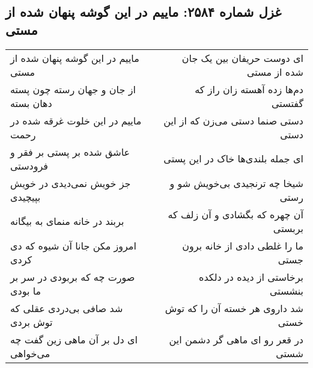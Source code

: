\begin{center}
\section*{غزل شماره ۲۵۸۴: ماییم در این گوشه پنهان شده از مستی}
\label{sec:2584}
\begin{longtable}{l p{0.5cm} r}
ماییم در این گوشه پنهان شده از مستی
&&
ای دوست حریفان بین یک جان شده از مستی
\\
از جان و جهان رسته چون پسته دهان بسته
&&
دم‌ها زده آهسته زان راز که گفتستی
\\
ماییم در این خلوت غرقه شده در رحمت
&&
دستی صنما دستی می‌زن که از این دستی
\\
عاشق شده بر پستی بر فقر و فرودستی
&&
ای جمله بلندی‌ها خاک در این پستی
\\
جز خویش نمی‌دیدی در خویش بپیچیدی
&&
شیخا چه ترنجیدی بی‌خویش شو و رستی
\\
بربند در خانه منمای به بیگانه
&&
آن چهره که بگشادی و آن زلف که بربستی
\\
امروز مکن جانا آن شیوه که دی کردی
&&
ما را غلطی دادی از خانه برون جستی
\\
صورت چه که بربودی در سر بر ما بودی
&&
برخاستی از دیده در دلکده بنشستی
\\
شد صافی بی‌دردی عقلی که توش بردی
&&
شد داروی هر خسته آن را که توش خستی
\\
ای دل بر آن ماهی زین گفت چه می‌خواهی
&&
در قعر رو ای ماهی گر دشمن این شستی
\\
\end{longtable}
\end{center}
